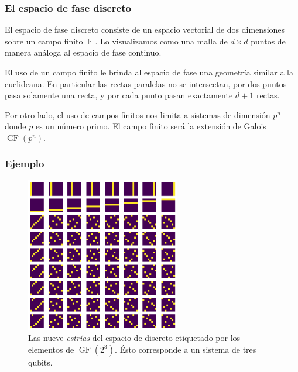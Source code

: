 \documentclass[10pt]{beamer}
\DeclareMathOperator{\F}{\mathbb{F}}
\DeclareMathOperator{\GF}{GF}
\begin{document}
  \begin{frame}
    \frametitle{El espacio de fase discreto}

    \begin{definition}
      El espacio de fase discreto consiste de un espacio
      vectorial de dos dimensiones sobre un campo finito
      $\F$. Lo visualizamos como una malla de $d \times d$ 
      puntos de manera análoga al espacio de fase continuo.
    \end{definition}

    \vspace{10pt}

    El uso de un campo finito le brinda al espacio de fase
    una geometría similar a la euclideana. En particular las
    rectas paralelas no se intersectan, por dos puntos pasa
    solamente una recta, y por cada punto pasan exactamente
    $d+1$ rectas.

    \vspace{10pt} 

    Por otro lado, el uso de campos finitos nos limita a
    sistemas de dimensión $p^{n}$ donde $p$ es un número
    primo. El campo finito será la extensión de Galois
    $\GF(p^{n})$.
  \end{frame}

  \begin{frame}
    \frametitle{Ejemplo}

    \begin{figure}[h]
      \centering
      \includegraphics[width=0.6\textwidth]{imgs/GF23.png}
      \caption{Las nueve \textit{estrías} del espacio de
      discreto etiquetado por los elementos de $\GF(2^{3})$.
      Ésto corresponde a un sistema de tres qubits.}
      \label{fig:GF23}
    \end{figure}
  \end{frame}
\end{document}
